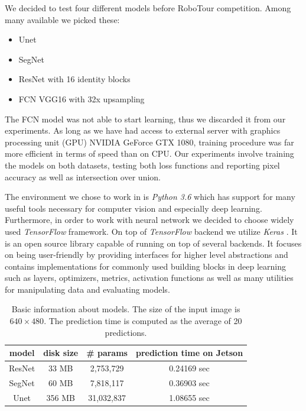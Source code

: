 We decided to test four different models before RoboTour competition. Among many available
we picked these:
\begin{itemize}
    \item Unet
    \item SegNet
    \item ResNet with 16 identity blocks
    \item FCN VGG16 with 32x upsampling
\end{itemize}

The FCN model was not able to start learning, thus we discarded it from our experiments.
As long as we have had access
to external server with graphics processing unit (GPU) NVIDIA GeForce GTX 1080, training
procedure was far more efficient in terms of speed than on CPU.
Our experiments involve training the models on both datasets, testing both loss functions
and reporting pixel accuracy as well as intersection over union.

The environment we chose to work in is \textit{Python 3.6} which has support for many
useful tools necessary for computer vision and especially deep learning.
Furthermore, in order to work with neural network we decided to choose widely used \textit{TensorFlow} \cite{bib:tensorflow2015} framework.
On top of \textit{TensorFlow} backend we utilize \textit{Keras}
\cite{bib:chollet2015keras}. It is an open source library capable of running on top of
several backends. It focuses on being user-friendly by providing interfaces for higher
level abstractions and contains implementations for commonly used building blocks
in deep learning such as layers, optimizers, metrics, activation functions as well as
many utilities for manipulating data and evaluating models.

\begin{table}[h]
	\centering
	\begin{tabular}{|c||c|c|c|} 
		\hline
		model & disk size & \# params & prediction time on Jetson \\
		\hline
		ResNet & 33 MB & 2,753,729 & 0.24169 sec \\
		\hline
		SegNet & 60 MB & 7,818,117 & 0.36903 sec \\
		\hline
		Unet & 356 MB & 31,032,837 & 1.08655 sec \\
		\hline
	\end{tabular}
	\caption[Basic information about models]{Basic information about models. The size of the input image is $640\times 480$. The prediction time is computed as the average of 20 predictions.}
	\label{tab:results_model_sizes}
\end{table}

